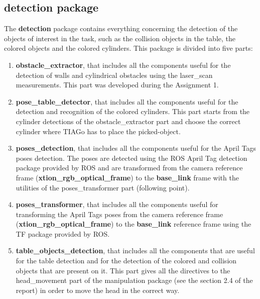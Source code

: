 \subsection{detection package}
The \textbf{detection} package contains everything concerning the detection of the objects of interest in the task, such as the collision objects in the table, the colored objects and the colored cylinders. This package is divided into five parts:
\begin{enumerate}
    \item \textbf{obstacle\_extractor}, that includes all the components useful for the detection of walls and cylindrical obstacles using the laser\_scan measurements. This part was developed during the Assignment 1. 
    \item \textbf{pose\_table\_detector}, that includes all the components useful for the detection and recognition of the colored cylinders. This part starts from the cylinder detections of the obstacle\_extractor part and choose the correct cylinder where TIAGo has to place the picked-object. 
    \item \textbf{poses\_detection}, that includes all the components useful for the April Tags poses detection. The poses are detected using the ROS April Tag detection package provided by ROS and are transformed from the camera reference frame (\textbf{xtion\_rgb\_optical\_frame}) to the \textbf{base\_link} frame with the utilities of the poses\_transformer part (following point).  
    \item \textbf{poses\_transformer}, that includes all the components useful for transforming the April Tags poses from the camera reference frame (\textbf{xtion\_rgb\_optical\_frame}) to the \textbf{base\_link} reference frame using the TF package provided by ROS.  
    \item \textbf{table\_objects\_detection}, that includes all the components that are useful for the table detection and for the detection of the colored and collision objects that are present on it. This part gives all the directives to the head\_movement part of the manipulation package (see the section 2.4 of the report) in order to move the head in the correct way. 
\end{enumerate}

